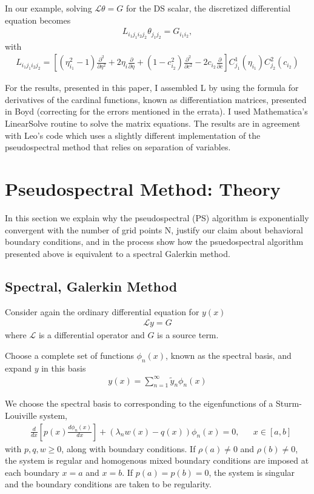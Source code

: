 \documentclass[aps,prd,amsmath,showpacs,amssymb,superscriptaddress,nofootinbib,longbibliography,eqsecnum,preprintnumbers]{revtex4-1}
\begin{document}
In our example, solving $\mathcal L\theta=G$ for the DS scalar,
the discretized differential equation becomes
\begin{align}
L_{i_1j_1i_2j_2}\theta_{j_1j_2}=G_{i_1i_2}, \label{eq:L4}
\end{align}
with 
\begin{align}
L_{i_1j_1i_2j_2}=\left[(\eta_{i_1}^2-1)\frac{\partial^2}{\partial \eta^2}+2\eta_i \frac{\partial}{\partial \eta}+(1-c_{i_2}^2)\frac{\partial^2}{\partial c^2}-2c_{i_2}\frac{\partial }{\partial c}\right]C^1_{j_1}(\eta_{i_1})C^2_{j_2}(c_{i_2})
\end{align}

For the results, presented in this paper, I assembled L by using the formula for derivatives of the cardinal functions, known as differentiation matrices, presented in Boyd \cite{Boyd99chebyshevand} (correcting for the errors mentioned in the errata). I used Mathematica's LinearSolve routine to solve the matrix equations. The results are in agreement with Leo's code which uses a slightly different implementation of the pseudospectral method that relies on separation of variables.

\section{Pseudospectral Method: Theory}
In this section we explain why the pseudospectral (PS) algorithm is exponentially convergent with the number of grid points N, justify our claim about behavioral boundary conditions, and in the process show how the psuedospectral algorithm presented above is equivalent to a spectral Galerkin method.

\subsection{Spectral, Galerkin Method}
Consider again the ordinary differential equation for $y(x)$
\begin{align}
\mathcal{L} y = G \label{eq:ODE}
\end{align}
where $\mathcal L$ is a differential operator and $G$ is a source term.

Choose a complete set of functions ${\phi_n(x)}$, known as the spectral basis, and expand $y$ in this basis
\begin{align}
y(x)=\sum_{n=1}^\infty\tilde y_n\phi_n(x)
\end{align}

We choose the spectral basis to corresponding to the eigenfunctions of a Sturm-Louiville system,
\begin{align}
&\frac{d}{dx}\left[p(x)\frac{d\phi_n(x)}{dx}\right]+(\lambda_n w(x)-q(x))\phi_n(x)=0,& &x\in[a,b]
\end{align}
with $p,q,w\geq 0$, along with boundary conditions. If $\rho(a)\neq 0$ and $\rho(b)\neq 0$, the system is regular and homogenous mixed boundary conditions are imposed at each boundary $x=a$ and $x=b$. If $p(a)=p(b)=0$, the system is singular and the boundary conditions are taken to be regularity.
\end{document}
